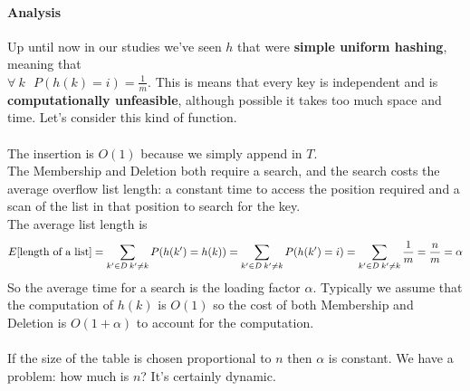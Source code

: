 \documentclass[10pt]{report}
\begin{document}
\paragraph{Analysis} Up until now in our studies we've seen $h$ that were \textbf{simple uniform hashing}, meaning that\\$\forall\:k\:\:\:P(h(k) = i)=\frac{1}{m}$. This is means that every key is independent and is \textbf{computationally unfeasible}, although possible it takes too much space and time. Let's consider this kind of function.\\\\
The insertion is $O(1)$ because we simply append in $T$.\\
The Membership and Deletion both require a search, and the search costs the average overflow list length: a constant time to access the position required and a scan of the list in that position to search for the key.\\
The average list length is $$E[\hbox{length of a list}]=\sum_{k'\in D\:k'\neq k} P(h(k')=h(k)) = \sum_{k'\in D\:k'\neq k} P(h(k')=i) = \sum_{k'\in D\:k'\neq k} \frac{1}{m} = \frac{n}{m} = \alpha$$
So the average time for a search is the loading factor $\alpha$. Typically we assume that the computation of $h(k)$ is $O(1)$ so the cost of both Membership and Deletion is $O(1+\alpha)$ to account for the computation.\\\\
If the size of the table is chosen proportional to $n$ then $\alpha$ is constant. We have a problem: how much is $n$? It's certainly dynamic.
\end{document}
